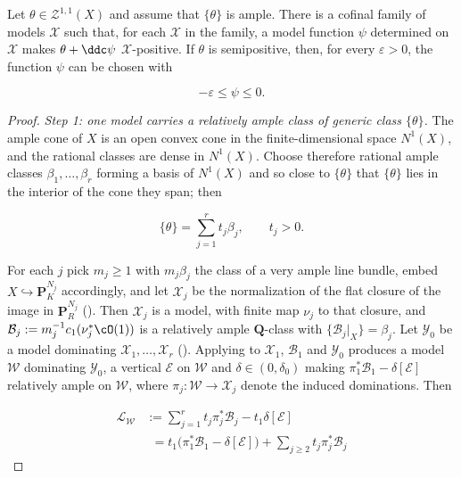\begin{proposition}\label{prop:ch20-positive-representative}
Let $\theta\in\mathcal Z^{1,1}(X)$ and assume that
$\{\theta\}$ is ample.  There is a cofinal family of models
$\mathcal X$ such that, for each $\mathcal X$ in the family, a model
function $\psi$ determined on $\mathcal X$ makes
$\theta+\ddc\psi$ $\mathcal X$-positive.  If $\theta$ is
semipositive, then, for every $\varepsilon>0$, the function $\psi$ can
be chosen with

\begin{equation}
\label{eq:ch20-small-positive-representative}
                       -\varepsilon\leq\psi\leq0.
\end{equation}
\end{proposition}

\begin{proof}
\emph{Step 1: one model carries a relatively ample class of generic class
$\{\theta\}$.}  The ample cone of $X$ is an open convex cone in the
finite-dimensional space $N^1(X)$, and the rational classes are dense in
$N^1(X)$.  Choose therefore rational ample classes
$\beta_1,\ldots,\beta_r$ forming a basis of $N^1(X)$ and so close to
$\{\theta\}$ that $\{\theta\}$ lies in the interior of the cone they
span; then

\begin{equation}
\label{eq:ch20-ample-decomposition}
 \{\theta\}=\sum_{j=1}^rt_j\beta_j,\qquad t_j>0 .
\end{equation}

For each $j$ pick $m_j\geq1$ with $m_j\beta_j$ the class of a very
ample line bundle, embed $X\hookrightarrow\mathbf P^{N_j}_K$ accordingly,
and let $\mathcal X_j$ be the normalization of the flat closure of the
image in $\mathbf P^{N_j}_R$ ().  Then $\mathcal X_j$
is a model, with finite map $\nu_j$ to that closure, and
$\mathcal B_j:=m_j^{-1}c_1(\nu_j^*\cO(1))$ is a relatively ample
$\mathbf Q$-class with $\{\mathcal B_j|_X\}=\beta_j$.  Let
$\mathcal Y_0$ be a model dominating $\mathcal X_1,\ldots,\mathcal X_r$
().  Applying
 to $\mathcal X_1$, $\mathcal B_1$ and
$\mathcal Y_0$ produces a model $\mathcal W$ dominating
$\mathcal Y_0$, a vertical $\mathcal E$ on $\mathcal W$ and
$\delta\in(0,\delta_0)$ making
$\pi_1^*\mathcal B_1-\delta[\mathcal E]$ relatively ample on
$\mathcal W$, where $\pi_j:\mathcal W\to\mathcal X_j$ denote the induced
dominations.  Then

\[
\begin{aligned}
 \mathcal L_{\mathcal W}
 &:=\sum_{j=1}^rt_j\pi_j^*\mathcal B_j-t_1\delta[\mathcal E]\\
 &\phantom{:}=t_1\bigl(\pi_1^*\mathcal B_1-\delta[\mathcal E]\bigr)
  +\sum_{j\geq2}t_j\pi_j^*\mathcal B_j
\end{aligned}
\]


\end{proof}
